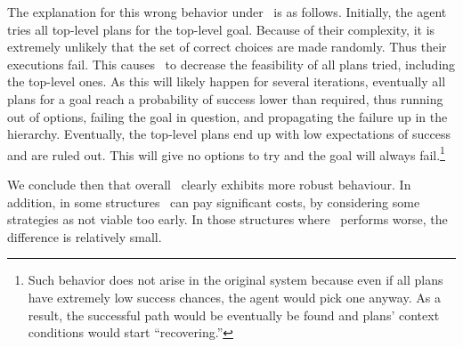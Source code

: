The explanation for this wrong behavior under \CL\ is as
follows. Initially, the agent tries all top-level plans for the
top-level goal. Because of their complexity, it is extremely unlikely
that the set of correct choices are made randomly. Thus their
executions fail.
This causes \CL\ to decrease the feasibility of all plans
tried, including the top-level ones. As this will likely happen
for several iterations, eventually all plans for a goal reach a probability of
success lower than required, thus
running out of options, failing the goal in question, and propagating
the failure up in the hierarchy. Eventually, the top-level plans end
up with low expectations of success and are ruled out.
This will give no options to try and the goal will always
fail.\footnote{Such behavior does not arise in the original
system because even if all plans have extremely low success chances,
the agent would pick one anyway. As a result, the successful path
would be eventually be found and plans' context conditions would start
``recovering.''}

We conclude then that overall \BUL\ clearly exhibits more robust
behaviour. In addition, in some structures \CL\ can pay significant
costs, by considering some strategies as not viable too early. In
those structures where \BUL\ performs worse, the difference is
relatively small. 



